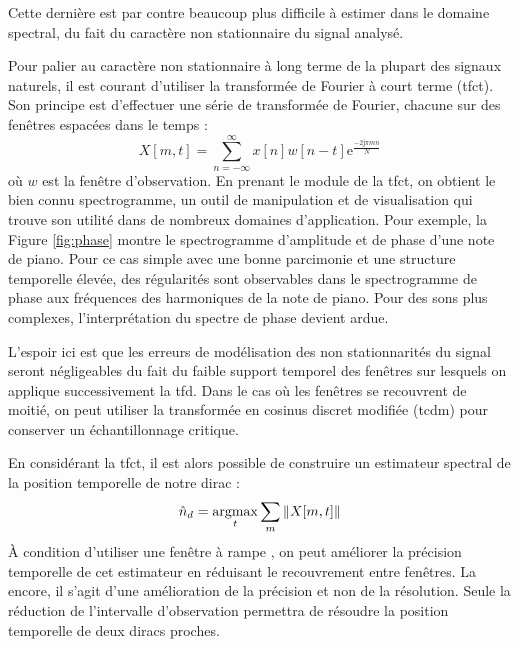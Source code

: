 Cette dernière est par contre beaucoup plus difficile à estimer dans le domaine spectral, du fait du caractère non stationnaire du signal analysé.


Pour palier au caractère non stationnaire à long terme de la plupart des signaux naturels, il est courant d'utiliser la transformée de Fourier à court terme (tfct). Son principe est d'effectuer une série de transformée de Fourier, chacune sur des fenêtres espacées dans le temps :
\begin{equation}
X[m, t] = \sum_{n = - \infty}^{\infty} x[n] w[n-t] \mathrm{e}^{\frac{-2 \mathrm{j}  \pi m n}{N}}
\end{equation}
où $w$ est la fenêtre d'observation. En prenant le module de la tfct, on obtient le bien connu spectrogramme, un outil de manipulation et de visualisation qui trouve son utilité dans de nombreux domaines d'application. Pour exemple, la Figure \ref{fig:phase} montre le spectrogramme d'amplitude et de phase d'une note de piano. Pour ce cas simple avec une bonne parcimonie et une structure temporelle élevée, des régularités sont observables dans le spectrogramme de phase aux fréquences des harmoniques de la note de piano. Pour des sons plus complexes, l'interprétation du spectre de phase devient ardue.


L'espoir ici est que les erreurs de modélisation des non stationnarités du signal seront négligeables du fait du faible support temporel des fenêtres sur lesquels on applique successivement la tfd. Dans le cas où les fenêtres se recouvrent de moitié, on peut utiliser la transformée en cosinus discret modifiée (tcdm) pour conserver un échantillonnage critique.~\cite{princen1986analysis}

En considérant la tfct, il est alors possible de construire un estimateur \og spectral \fg de la position temporelle de notre dirac :
\begin{equation}
\hat{n}_d = \operatorname*{argmax}_t \sum_m  \| X[m, t] \|
\end{equation}
\`A condition d'utiliser une fenêtre \fg à rampe \og, on peut améliorer la précision temporelle de cet estimateur en réduisant le recouvrement entre fenêtres. La encore, il s'agit d'une amélioration de la précision et non de la résolution. Seule la réduction de l'intervalle d'observation permettra de résoudre la position temporelle de deux diracs proches.

